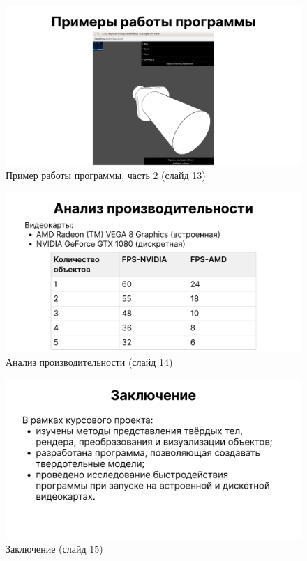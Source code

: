 \begin{figure}[h]
	\centering
	\captionsetup{justification=centering}
	\includegraphics[width=150mm]{img/slide13.png}
	\caption{Пример работы программы, часть 2 (слайд 13)}
	\label{fig:slide-13}
\end{figure}

\begin{figure}[h]
	\centering
	\captionsetup{justification=centering}
	\includegraphics[width=150mm]{img/slide14.png}
	\caption{Анализ производительности (слайд 14)}
	\label{fig:slide-14}
\end{figure}

\begin{figure}[h]
	\centering
	\captionsetup{justification=centering}
	\includegraphics[width=150mm]{img/slide15.png}
	\caption{Заключение (слайд 15)}
	\label{fig:slide-15}
\end{figure}
\pagebreak